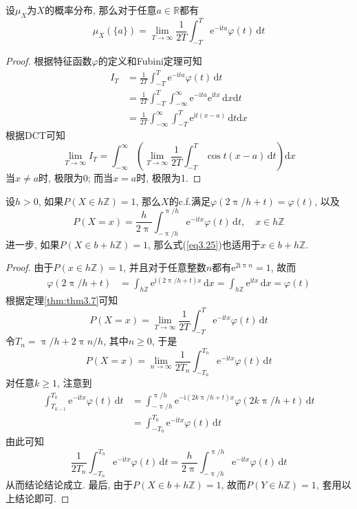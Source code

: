 \documentclass[cn, 12pt, math=mtpro2, bibstyle=apa, blue, twocol]{elegantbook}
\newcommand{\R}{\mathbb{R}}
\newcommand{\limn}{\lim_{n\to\infty}}
\begin{document}
\begin{theorem}\label{thm:thm3.7}
设$\mu_X$为$X$的概率分布, 那么对于任意$a\in\R$都有
 $$\mu_X(\{a\})=\lim_{T\to\infty}\frac{1}{2T}\int_{-T}^{T}\text{e}^{-\text{i}ta}\varphi(t)\,\text{d}t$$
\end{theorem}
\begin{proof}
  根据特征函数$\varphi$的定义和Fubini定理可知
  \begin{align*}
  I_T&=\frac{1}{2T}\int_{-T}^{T}\text{e}^{-\text{i}ta}\varphi(t)\,\text{d}t \\
  &=\frac{1}{2T}\int_{-T}^{T}\int_{-\infty}^{\infty}\text{e}^{-\text{i}ta}\text{e}^{\text{i}tx}\,\text{d}x\text{d}t \\
  &=\frac{1}{2T}\int_{-\infty}^{\infty}\int_{-T}^{T}\text{e}^{\text{i}t(x-a)}\,\text{d}t\text{d}x
  \end{align*}
  根据DCT可知
  $$\lim_{T\to\infty}I_T=\int_{-\infty}^{\infty}\left(\lim_{T\to\infty}\frac{1}{2T}\int_{-T}^{T}\cos t(x-a)\,\text{d}t\right)\text{d}x$$
  当$x\neq a$时, 极限为0; 而当$x=a$时, 极限为1.
\end{proof}
\begin{example}
  设$h>0$, 如果$P(X\in h\mathbb{Z})=1$, 那么$X$的c.f.满足$\varphi(2\uppi/h+t)=\varphi(t)$, 以及
  \begin{equation}\label{eq3.25}
    P(X=x)=\frac{h}{2\uppi}\int_{-\uppi/h}^{\uppi/h}\text{e}^{-\text{i}tx}\varphi(t)\,\text{d}t,\quad x\in h\mathbb{Z}
  \end{equation}
  进一步, 如果$P(X\in b+h\mathbb{Z})=1$, 那么式(\ref{eq3.25})也适用于$x\in b+h\mathbb{Z}$.
\end{example}
\begin{proof}
  由于$P(x\in h\mathbb{Z})=1$, 并且对于任意整数$n$都有$\text{e}^{2\text{i}\uppi n}=1$, 故而
  \begin{align*}
  \varphi(2\uppi/h+t)&=\int_{h\mathbb{Z}}\text{e}^{\text{i}(2\uppi/h+t)x}\,\text{d}x=\int_{h\mathbb{Z}}\text{e}^{\text{i}tx}\,\text{d}x=\varphi(t)
  \end{align*}
  根据定理\ref{thm:thm3.7}可知
  $$P(X=x)=\lim_{T\to\infty}\frac{1}{2T}\int_{-T}^{T}\text{e}^{-\text{i}tx}\varphi(t)\,\text{d}t$$
  令$T_n=\uppi/h+2\uppi n/h$, 其中$n\geq0$, 于是
  $$P(X=x)=\limn\frac{1}{2T_n}\int_{-T_n}^{T_n}\text{e}^{-\text{i}tx}\varphi(t)\,\text{d}t$$
  对任意$k\ge1$, 注意到
  \begin{align*}
  \int_{T_{k-1}}^{T_k}\text{e}^{-\text{i}tx}\varphi(t)\,\text{d}t&=\int_{-\uppi/h}^{\uppi/h}\text{e}^{-\text{i}(2k\uppi/h+t)x}\varphi(2k\uppi/h+t)\,\text{d}t \\
  &=\int_{-T_0}^{T_0}\text{e}^{-\text{i}tx}\varphi(t)\,\text{d}t
  \end{align*}
  由此可知
  $$\frac{1}{2T_n}\int_{-T_n}^{T_n}\text{e}^{-\text{i}tx}\varphi(t)\,\text{d}t=\frac{h}{2\uppi}\int_{-\uppi/h}^{\uppi/h}\text{e}^{-\text{i}tx}\varphi(t)\,\text{d}t$$
  从而结论结论成立. 最后, 由于$P(X\in b+h\mathbb{Z})=1$, 故而$P(Y \in h\mathbb{Z})=1$, 套用以上结论即可.
\end{proof}
\end{document}
